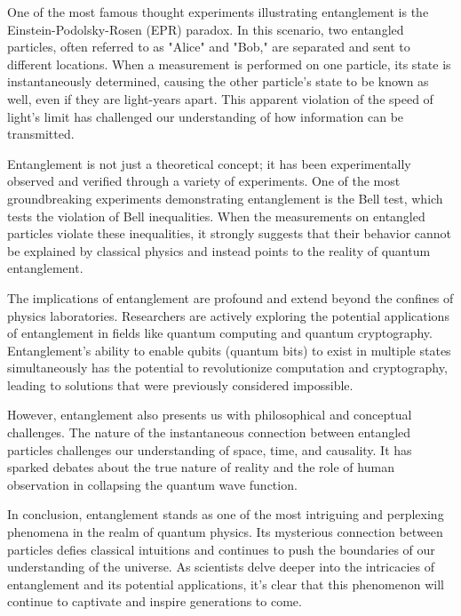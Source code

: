 \documentclass{book}
\begin{document}
One of the most famous thought experiments illustrating entanglement is the Einstein-Podolsky-Rosen (EPR) paradox. In this scenario, two entangled particles, often referred to as "Alice" and "Bob," are separated and sent to different locations. When a measurement is performed on one particle, its state is instantaneously determined, causing the other particle's state to be known as well, even if they are light-years apart. This apparent violation of the speed of light's limit has challenged our understanding of how information can be transmitted.

Entanglement is not just a theoretical concept; it has been experimentally observed and verified through a variety of experiments. One of the most groundbreaking experiments demonstrating entanglement is the Bell test, which tests the violation of Bell inequalities. When the measurements on entangled particles violate these inequalities, it strongly suggests that their behavior cannot be explained by classical physics and instead points to the reality of quantum entanglement.

The implications of entanglement are profound and extend beyond the confines of physics laboratories. Researchers are actively exploring the potential applications of entanglement in fields like quantum computing and quantum cryptography. Entanglement's ability to enable qubits (quantum bits) to exist in multiple states simultaneously has the potential to revolutionize computation and cryptography, leading to solutions that were previously considered impossible.

However, entanglement also presents us with philosophical and conceptual challenges. The nature of the instantaneous connection between entangled particles challenges our understanding of space, time, and causality. It has sparked debates about the true nature of reality and the role of human observation in collapsing the quantum wave function.

In conclusion, entanglement stands as one of the most intriguing and perplexing phenomena in the realm of quantum physics. Its mysterious connection between particles defies classical intuitions and continues to push the boundaries of our understanding of the universe. As scientists delve deeper into the intricacies of entanglement and its potential applications, it's clear that this phenomenon will continue to captivate and inspire generations to come.


\newpage
\end{document}
